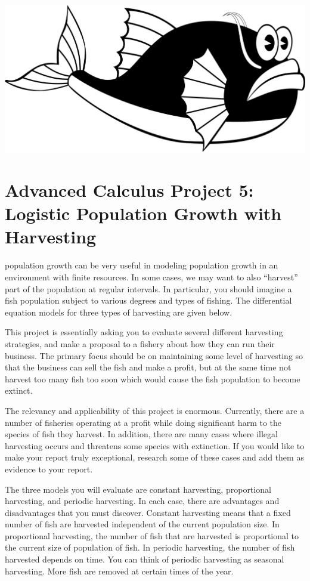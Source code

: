 \documentclass
[justified,nohyper]
{tufte-handout}
\begin{document}
\includegraphics[scale=0.3]{fish.png}
\section{Advanced Calculus Project 5: Logistic Population Growth with Harvesting}

 population growth can be very useful in modeling population
growth in 
an environment with finite resources. In some cases, we may want to also ``harvest'' part of the 
population at regular intervals. In particular, you should imagine a fish population subject to 
various degrees and types of fishing. The differential equation models for three types of
harvesting are given below.

This project is essentially asking you to evaluate several different harvesting strategies, and
make a proposal to a fishery about how they can run their business. The primary focus should be
on maintaining some level of harvesting so that the business can sell the fish and make a profit,
but at the same time not harvest too many fish too soon which would cause the fish population
to become extinct.

The relevancy and applicability of this project is enormous. Currently, there are a number
of fisheries operating at a profit while doing significant harm to the species of fish they
harvest. In addition, there are many cases where illegal harvesting occurs and threatens some
species with extinction. If you would like to make your report truly exceptional, research some
of these cases and add them as evidence to your report.

The three models you will evaluate are constant harvesting, proportional harvesting, and periodic
harvesting. In each case, there are advantages and disadvantages that you must discover. Constant
harvesting means that a fixed number of fish are harvested independent of the current population
size.
In proportional harvesting, the number of fish that are harvested is proportional to the current
size of population of fish. In periodic harvesting, the number of fish harvested depends on time.
You
can think of periodic harvesting as seasonal harvesting. More fish are removed at certain times
of the year.
\end{document}
